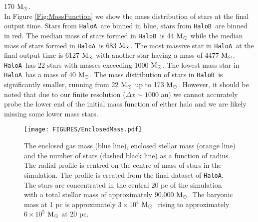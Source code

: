 \documentclass[twocolumn,iop,revtex4]{openjournal}
\newcommand{\msolar} {$\rm{M_{\odot}}~$}
\newcommand{\msolarc} {$\rm{M_{\odot}}$}
\newcommand{\ha} {\texttt{HaloA~}}
\newcommand{\hb} {\texttt{HaloB~}}
\newcommand{\hac} {\texttt{HaloA}}
\begin{document}
170 \msolarc.\\
\indent In Figure \ref{Fig:MassFunction} we show the mass distribution of stars at the final
output time. Stars from \ha are binned in blue, stars from \hb are binned in red. The median mass
of stars formed in \hb is 44 \msolar while the median mass of stars formed in \ha is 683 \msolarc.
The most massive star in \ha at the final output time is 6127 \msolar with another star having a mass
of 4477 \msolarc. \ha has 22 stars with masses exceeding 1000 \msolarc. The lowest mass star in
\ha has a mass of 40 \msolarc. The mass distribution of stars in \hb is significantly smaller, running
from 22 \msolar up to 173 \msolarc. However, it should be noted that due to our finite resolution
($\Delta x \sim 1000$ au) we cannot accurately probe the lower end of the initial mass function
of either halo and we are likely missing some lower mass stars. 
\begin{figure}
   \centering 
\texttt{[image: FIGURES/EnclosedMass.pdf]}
\caption{The enclosed gas mass (blue line), enclosed stellar mass (orange line) and the number of
stars (dashed black line) as a function of radius. The radial profile is centred on the centre
of mass of stars in the simulation. The profile is created from the final dataset of \hac.
The stars are concentrated in the central 20 pc of the simulation with a total stellar mass of
approximately 90,000 \msolarc. The baryonic mass at 1 pc is approximately $3 \times 10^4$ \msolar
rising to approximately $6 \times 10^5$ \msolar at 20 pc. }
\label{Fig:EnclosedMass}
\end{figure}
\end{document}
